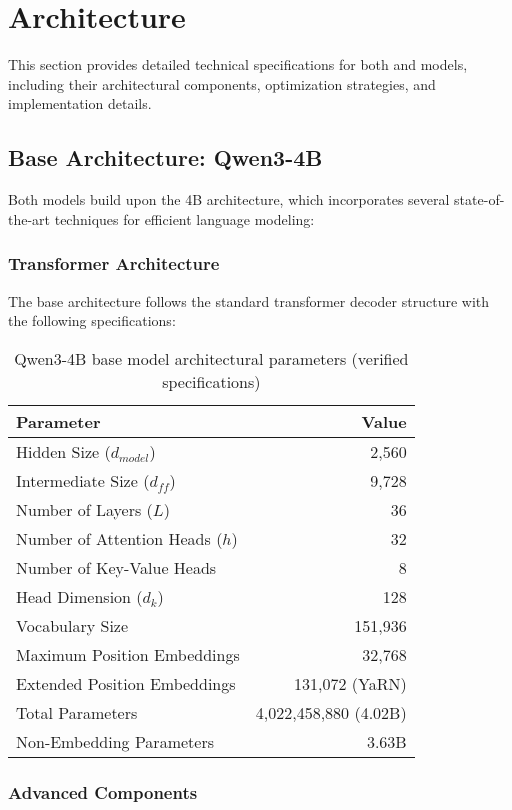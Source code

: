 \section{Architecture}
\label{sec:architecture}

This section provides detailed technical specifications for both \supra{} and \zennano{} models, including their architectural components, optimization strategies, and implementation details.

\subsection{Base Architecture: Qwen3-4B}

Both models build upon the \qwen{} 4B architecture, which incorporates several state-of-the-art techniques for efficient language modeling:

\subsubsection{Transformer Architecture}
The base architecture follows the standard transformer decoder structure with the following specifications:

\begin{table}[H]
\centering
\begin{tabular}{lr}
\toprule
Parameter & Value \\
\midrule
Hidden Size ($d_{model}$) & 2,560 \\
Intermediate Size ($d_{ff}$) & 9,728 \\
Number of Layers ($L$) & 36 \\
Number of Attention Heads ($h$) & 32 \\
Number of Key-Value Heads & 8 \\
Head Dimension ($d_k$) & 128 \\
Vocabulary Size & 151,936 \\
Maximum Position Embeddings & 32,768 \\
Extended Position Embeddings & 131,072 (YaRN) \\
Total Parameters & 4,022,458,880 (4.02B) \\
Non-Embedding Parameters & 3.63B \\
\bottomrule
\end{tabular}
\caption{Qwen3-4B base model architectural parameters (verified specifications)}
\label{tab:base-architecture}
\end{table}

\subsubsection{Advanced Components}

